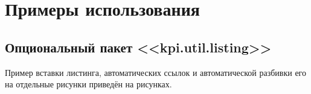\section{Примеры использования}
	\subsection{Опциональный пакет <<kpi.util.listing>>}
		Пример вставки листинга, автоматических ссылок и автоматической разбивки его
		на отдельные рисунки приведён на
		рисунках.
